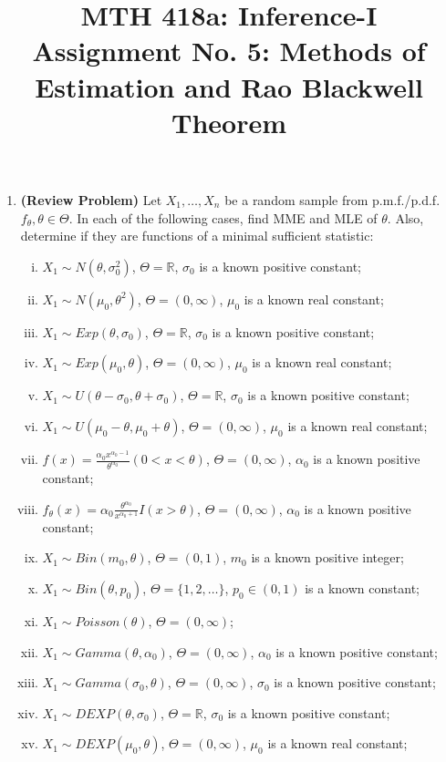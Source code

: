 \documentclass[11pt]{article}
\title{MTH 418a: Inference-I \\ Assignment No. 5: Methods of Estimation and Rao Blackwell Theorem}
\author{}
\date{}
\begin{document}
\maketitle

\begin{enumerate}
    \item \textbf{(Review Problem)} Let $X_{1}, \dots, X_{n}$ be a random sample from p.m.f./p.d.f. $f_{\theta}, \theta \in \Theta$.
    In each of the following cases, find MME and MLE of $\theta$. Also, determine if they are functions of a minimal sufficient statistic:
    \begin{enumerate}[(i)]
        \item $X_{1} \sim N(\theta, \sigma_{0}^{2})$, $\Theta = \mathbb{R}$, $\sigma_{0}$ is a known positive constant;
        \item $X_{1} \sim N(\mu_{0}, \theta^{2})$, $\Theta = (0, \infty)$, $\mu_{0}$ is a known real constant;
        \item $X_{1} \sim Exp(\theta, \sigma_{0})$, $\Theta = \mathbb{R}$, $\sigma_{0}$ is a known positive constant;
        \item $X_{1} \sim Exp(\mu_{0}, \theta)$, $\Theta = (0, \infty)$, $\mu_{0}$ is a known real constant;
        \item $X_{1} \sim U(\theta - \sigma_{0}, \theta + \sigma_{0})$, $\Theta = \mathbb{R}$, $\sigma_{0}$ is a known positive constant;
        \item $X_{1} \sim U(\mu_{0} - \theta, \mu_{0} + \theta)$, $\Theta = (0, \infty)$, $\mu_{0}$ is a known real constant;
        \item $f(x) = \frac{\alpha_{0} x^{\alpha_{0}-1}}{\theta^{\alpha_{0}}} (0 < x < \theta)$, $\Theta = (0, \infty)$, $\alpha_{0}$ is a known positive constant;
        \item $f_{\theta}(x) = \alpha_{0} \frac{\theta^{\alpha_{0}}}{x^{\alpha_{0}+1}} I(x > \theta)$, $\Theta = (0, \infty)$, $\alpha_{0}$ is a known positive constant;
        \item $X_{1} \sim Bin(m_{0}, \theta)$, $\Theta = (0, 1)$, $m_{0}$ is a known positive integer;
        \item $X_{1} \sim Bin(\theta, p_{0})$, $\Theta = \{1, 2, \dots\}$, $p_{0} \in (0, 1)$ is a known constant;
        \item $X_{1} \sim Poisson(\theta)$, $\Theta = (0, \infty)$;
        \item $X_{1} \sim Gamma(\theta, \alpha_{0})$, $\Theta = (0, \infty)$, $\alpha_{0}$ is a known positive constant;
        \item $X_{1} \sim Gamma(\sigma_{0}, \theta)$, $\Theta = (0, \infty)$, $\sigma_{0}$ is a known positive constant;
        \item $X_{1} \sim DEXP(\theta, \sigma_{0})$, $\Theta = \mathbb{R}$, $\sigma_{0}$ is a known positive constant;
        \item $X_{1} \sim DEXP(\mu_{0}, \theta)$, $\Theta = (0, \infty)$, $\mu_{0}$ is a known real constant;
    \end{enumerate}


\end{enumerate}
\end{document}
